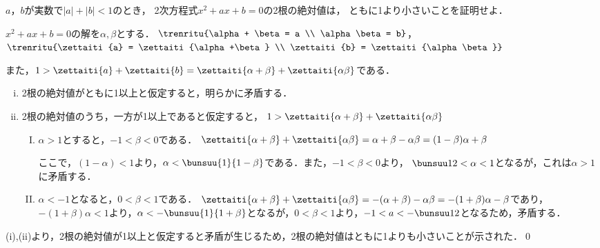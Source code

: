\begin{problem}
  $a$，$b$が実数で$|a|+|b|<1$のとき，
2次方程式$x^2+ax+b=0$の2根の絶対値は，
ともに1より小さいことを証明せよ．
\end{problem}

$x^2 + ax + b = 0$の解を$\alpha, \beta$とする．
$\trenritu{\alpha + \beta = a \\ \alpha\beta = b}$，$\trenritu{\zettaiti{a} = \zettaiti{\alpha+\beta} \\ \zettaiti{b} = \zettaiti{\alpha\beta}}$

また，$1 > \zettaiti{a} + \zettaiti{b} = \zettaiti{\alpha + \beta} + \zettaiti{\alpha\beta}$である．

\begin{enumerate}[(i)]
  \item 2根の絶対値がともに1以上と仮定すると，明らかに矛盾する．
  \item 2根の絶対値のうち，一方が1以上であると仮定すると，
  $1 > \zettaiti{\alpha + \beta} + \zettaiti{\alpha\beta}$
  \begin{enumerate}[(I)]
    \item $\alpha > 1$とすると，$-1 < \beta < 0$である．
    $\zettaiti{\alpha+\beta} + \zettaiti{\alpha\beta} = \alpha +\beta -\alpha\beta =(1-\beta)\alpha + \beta$

    ここで，$(1-\alpha)<1$より，$\alpha < \bunsuu{1}{1-\beta}$である．また，$-1 < \beta <0$より，
    $\bunsuu12 < \alpha < 1$となるが，これは$\alpha > 1$に矛盾する．

    \item $\alpha < -1$となると，$0 < \beta < 1$である．
    $\zettaiti{\alpha + \beta} + \zettaiti{\alpha\beta} = -(\alpha + \beta) - \alpha\beta
    =-(1+\beta)\alpha - \beta$であり，$-(1+\beta)\alpha < 1$より，$\alpha < -\bunsuu{1}{1+\beta}$となるが，$0<\beta<1$より，$-1 < a < -\bunsuu12$となるため，矛盾する．
  \end{enumerate}
\end{enumerate}

(i),(ii)より，2根の絶対値が1以上と仮定すると矛盾が生じるため，2根の絶対値はともに1よりも小さいことが示された．\qed
